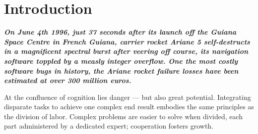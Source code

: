 \documentclass[12pt,a4paper,oneside,pdftex]{report}
\begin{document}
\label{pages-prelude}
\cleardoublepage

\startfirstchapter

\pagestyle{headings}


% 
\chapter{Introduction}
\label{chapter:introduction}


\begin{adjustwidth}{2.5em}{0pt}
\small
\textbf{\emph{On June 4th 1996, just 37 seconds after its launch off the Guiana Space Centre in French Guiana, carrier rocket Ariane 5 self-destructs in a magnificent spectral burst after veering off course, its navigation software toppled by a measly integer overflow. One the most costly software bugs in history, the Ariane rocket failure losses have been estimated at over 300 million euros. \citep{dowson1997ariane}}}
\normal
\end{adjustwidth}
\vspace{8 mm}

At the confluence of cognition lies danger --- but also great potential. Integrating disparate tasks to achieve one complex end result embodies the same principles as the division of labor. Complex problems are easier to solve when divided, each part administered by a dedicated expert; cooperation fosters growth. 
\end{document}
